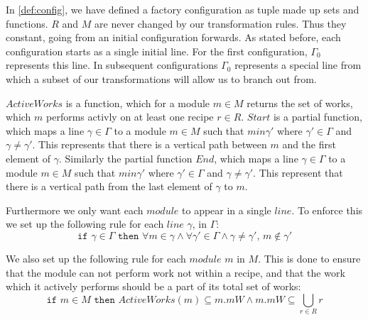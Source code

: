 In \cref{def:config}, we have defined a factory configuration as tuple made up sets and functions. $R$ and $M$ are never changed by our transformation rules. Thus they constant, going from an initial configuration forwards. As stated before, each configuration starts as a single initial line. For the first configuration, $\Gamma_0$ represents this line. In subsequent configurations $\Gamma_0$ represents a special line from which a subset of our transformations will allow us to branch out from.

$ActiveWorks$ is a function, which for a module $m \in M$ returns the set of works, which $m$ performs activly on at least one recipe $r \in R$. $Start$ is a partial function, which maps a line $\gamma \in \Gamma$ to a module $m \in M$ such that $m in \gamma'$ where $\gamma' \in \Gamma$ and $\gamma \neq \gamma'$. This represents that there is a vertical path between $m$ and the first element of $\gamma$. Similarly the partial function $End$, which maps a line $\gamma \in \Gamma$ to a module $m \in M$ such that $m in \gamma'$ where $\gamma' \in \Gamma$ and $\gamma \neq \gamma'$. This represent that there is a vertical path from the last element of $\gamma$ to $m$.   

Furthermore we only want each $module$ to appear in a single $line$. To enforce this we set up the following rule for each $line$ $\gamma$, in $\Gamma$:
\[\texttt{if } \gamma \in \Gamma \texttt{ then } \forall m \in \gamma \land \forall \gamma ' \in \Gamma \land \gamma \neq \gamma ',\, m \notin \gamma ' \]

We also set up the following rule for each $module$ $m$ in $M$. This is done to ensure that the module can not perform work not within a recipe, and that the work which it actively performs should be a part of its total set of works:
\[\texttt{if } m \in M \texttt{ then } ActiveWorks(m) \subseteq m.mW \land m.mW \subseteq  \bigcup_{r\in R}r\] 

 
 
 
 









